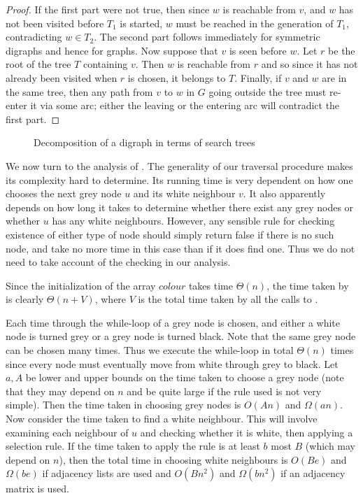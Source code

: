 \begin{proof}

If the first part were not true, then since $w$ is reachable from $v$, and $w$ has not been visited before $T_1$ is started, $w$ must be reached in the generation of $T_1$, contradicting $w\in T_2$. The second part follows immediately for symmetric digraphs and hence for graphs. Now suppose that $v$ is seen before $w$. Let $r$ be the root of the tree $T$ containing $v$. Then $w$ is reachable from $r$ and so since it has not already been visited when $r$ is chosen, it belongs to $T$. Finally, if $v$ and $w$ are in the same tree, then any path from $v$ to $w$ in $G$ going outside the tree must re-enter it via some arc; either the leaving or the entering arc will contradict the first part. 
\end{proof}


\begin{figure}[htbp]

\caption{Decomposition of a digraph in terms of search trees}
\label{fig:travdecomp}
\end{figure}

We now turn to the analysis of . The generality
of our traversal procedure makes its complexity hard to determine.  Its
running time is very dependent on how one chooses the next grey node $u$
and its white neighbour $v$. It also apparently depends on how long it
takes to determine whether there exist any grey nodes or whether $u$ has
any white neighbours. However, any sensible rule for checking existence
of either type of node should simply return false if there is no such
node, and take no more time in this case than if it does find one. Thus
we do not need to take account of the checking in our analysis.

Since the initialization of the array $colour$ takes time 
$\Theta(n)$, the time taken by  is clearly $\Theta(n +
V)$, where $V$ is the total time taken by all the calls to .

Each time through the while-loop of  a grey node is
chosen, and either a white node is turned grey or a grey node is turned
black. Note that the same grey node can be chosen many times. Thus we
execute the while-loop in total $\Theta(n)$
times since every node must eventually move from white through grey to
black. Let $a, A$ be lower and upper bounds on the time taken to choose a grey node (note that they may depend on $n$ and be quite large if the rule used is not very simple). Then the time taken in choosing grey nodes is $O(An)$ and $\Omega(an)$. Now consider the time taken to find a white neighbour. This will involve examining each  neighbour of $u$ and checking whether it is white, then applying a selection rule. If the time taken to apply the rule is at
least $b$ most $B$ (which may depend on $n$), then the total time in choosing white neighbours is $O(B e)$ and $\Omega(be)$ if adjacency lists are used and $O(Bn^2)$ and $\Omega(bn^2)$ if an adjacency matrix is used.

